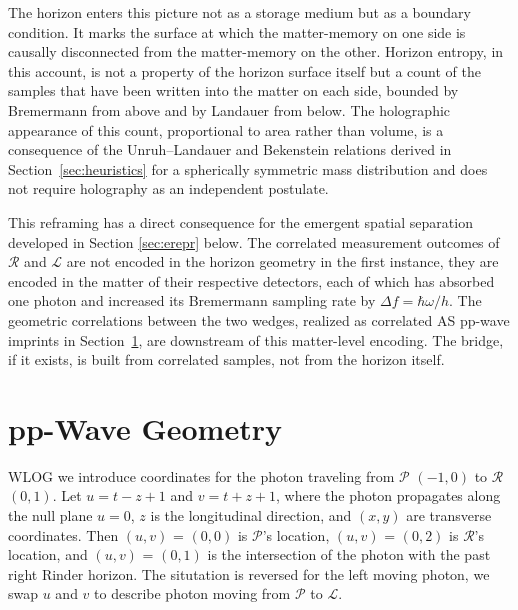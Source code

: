 \documentclass[12pt,a4paper]{article}
\begin{document}
The horizon enters this picture not as a storage medium but as a boundary condition. It marks
the surface at which the matter-memory on one side is causally disconnected from the
matter-memory on the other. Horizon entropy, in this account, is not a property of the
horizon surface itself but a count of the samples that have been written into the matter on
each side, bounded by Bremermann from above and by Landauer from below. The holographic
appearance of this count, proportional to area rather than volume, is a consequence of the
Unruh--Landauer and Bekenstein relations derived in Section~\ref{sec:heuristics} for a spherically symmetric mass distribution and does not require holography as an independent postulate.

This reframing has a direct consequence for the emergent spatial separation developed in
Section \ref{sec:erepr} below. The correlated measurement outcomes of $\mathcal{R}$ and $\mathcal{L}$ are not encoded in the horizon geometry in the first instance, they are encoded in the matter of their
respective detectors, each of which has absorbed one photon and increased its Bremermann 
sampling rate by $\Delta f = \hbar\omega/h$. The geometric correlations between the two wedges, realized as correlated AS pp-wave imprints in Section~\ref{sec:ppwave}, are downstream of this matter-level encoding. The bridge, if it exists, is built from correlated samples, not from the horizon itself.



\section{pp-Wave Geometry}
\label{sec:ppwave}
WLOG we introduce coordinates for the photon traveling from $\mathcal{P}$ $(-1,0)$ to $\mathcal{R}$ $(0,1)$. Let $u = t - z + 1$ and $v = t + z + 1$, where the photon propagates along the null plane $u = 0$, $z$ is the longitudinal direction, and $(x,y)$ are transverse coordinates. Then $(u,v)$ = $(0,0)$ is $\mathcal{P}$'s location, $(u,v)$ = $(0,2)$ is $\mathcal{R}$'s location, and $(u,v)$ = $(0,1)$ is the intersection of the photon with the past right Rinder horizon. The situtation is reversed for the left moving photon, we swap $u$ and $v$ to describe photon moving from $\mathcal{P}$ to $\mathcal{L}$.
\end{document}

